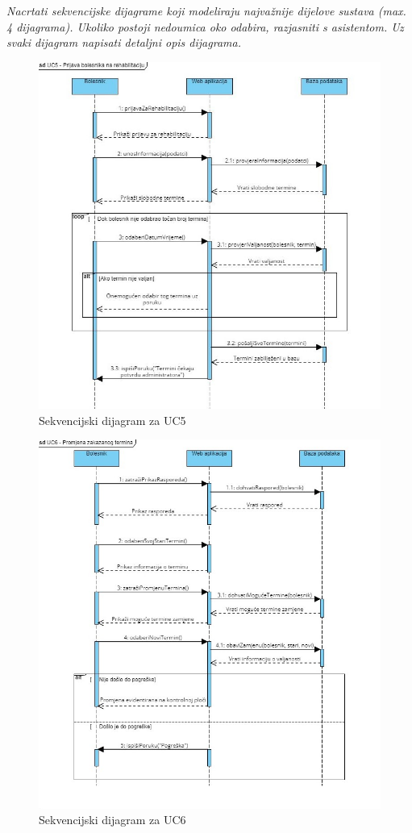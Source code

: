 \documentclass[12pt]{report}
\begin{document}
\textit{Nacrtati sekvencijske dijagrame koji modeliraju najvažnije dijelove sustava (max. 4 dijagrama). Ukoliko postoji nedoumica oko odabira, razjasniti s asistentom. Uz svaki dijagram napisati detaljni opis dijagrama.}
\begin{figure}[h]
    \centering
    \includegraphics[width=\textwidth]{./slike/Sekvencijski - UC5.jpg} 
    \caption{Sekvencijski dijagram za UC5}
    \label{fig:my_image}
\end{figure}
\begin{figure}[p]
    \centering
    \includegraphics[width=\textwidth]{./slike/Sekvencijski - UC6.jpg} 
    \caption{Sekvencijski dijagram za UC6}
    \label{fig:my_image}
\end{figure}
\end{document}
